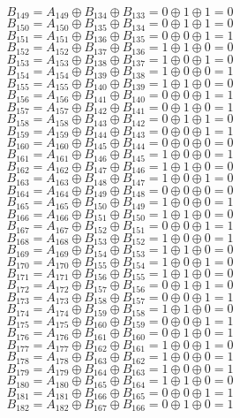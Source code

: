 \documentclass[12pt,onecolumn]{article}
\begin{document}
$$B_{149} = A_{149} \oplus B_{134} \oplus B_{133} = 0 \oplus 1 \oplus 1 = 0$$
$$B_{150} = A_{150} \oplus B_{135} \oplus B_{134} = 0 \oplus 1 \oplus 1 = 0$$
$$B_{151} = A_{151} \oplus B_{136} \oplus B_{135} = 0 \oplus 0 \oplus 1 = 1$$
$$B_{152} = A_{152} \oplus B_{137} \oplus B_{136} = 1 \oplus 1 \oplus 0 = 0$$
$$B_{153} = A_{153} \oplus B_{138} \oplus B_{137} = 1 \oplus 0 \oplus 1 = 0$$
$$B_{154} = A_{154} \oplus B_{139} \oplus B_{138} = 1 \oplus 0 \oplus 0 = 1$$
$$B_{155} = A_{155} \oplus B_{140} \oplus B_{139} = 1 \oplus 1 \oplus 0 = 0$$
$$B_{156} = A_{156} \oplus B_{141} \oplus B_{140} = 0 \oplus 0 \oplus 1 = 1$$
$$B_{157} = A_{157} \oplus B_{142} \oplus B_{141} = 0 \oplus 1 \oplus 0 = 1$$
$$B_{158} = A_{158} \oplus B_{143} \oplus B_{142} = 0 \oplus 1 \oplus 1 = 0$$
$$B_{159} = A_{159} \oplus B_{144} \oplus B_{143} = 0 \oplus 0 \oplus 1 = 1$$
$$B_{160} = A_{160} \oplus B_{145} \oplus B_{144} = 0 \oplus 0 \oplus 0 = 0$$
$$B_{161} = A_{161} \oplus B_{146} \oplus B_{145} = 1 \oplus 0 \oplus 0 = 1$$
$$B_{162} = A_{162} \oplus B_{147} \oplus B_{146} = 1 \oplus 1 \oplus 0 = 0$$
$$B_{163} = A_{163} \oplus B_{148} \oplus B_{147} = 1 \oplus 0 \oplus 1 = 0$$
$$B_{164} = A_{164} \oplus B_{149} \oplus B_{148} = 0 \oplus 0 \oplus 0 = 0$$
$$B_{165} = A_{165} \oplus B_{150} \oplus B_{149} = 1 \oplus 0 \oplus 0 = 1$$
$$B_{166} = A_{166} \oplus B_{151} \oplus B_{150} = 1 \oplus 1 \oplus 0 = 0$$
$$B_{167} = A_{167} \oplus B_{152} \oplus B_{151} = 0 \oplus 0 \oplus 1 = 1$$
$$B_{168} = A_{168} \oplus B_{153} \oplus B_{152} = 1 \oplus 0 \oplus 0 = 1$$
$$B_{169} = A_{169} \oplus B_{154} \oplus B_{153} = 1 \oplus 1 \oplus 0 = 0$$
$$B_{170} = A_{170} \oplus B_{155} \oplus B_{154} = 1 \oplus 0 \oplus 1 = 0$$
$$B_{171} = A_{171} \oplus B_{156} \oplus B_{155} = 1 \oplus 1 \oplus 0 = 0$$
$$B_{172} = A_{172} \oplus B_{157} \oplus B_{156} = 0 \oplus 1 \oplus 1 = 0$$
$$B_{173} = A_{173} \oplus B_{158} \oplus B_{157} = 0 \oplus 0 \oplus 1 = 1$$
$$B_{174} = A_{174} \oplus B_{159} \oplus B_{158} = 1 \oplus 1 \oplus 0 = 0$$
$$B_{175} = A_{175} \oplus B_{160} \oplus B_{159} = 0 \oplus 0 \oplus 1 = 1$$
$$B_{176} = A_{176} \oplus B_{161} \oplus B_{160} = 0 \oplus 1 \oplus 0 = 1$$
$$B_{177} = A_{177} \oplus B_{162} \oplus B_{161} = 1 \oplus 0 \oplus 1 = 0$$
$$B_{178} = A_{178} \oplus B_{163} \oplus B_{162} = 1 \oplus 0 \oplus 0 = 1$$
$$B_{179} = A_{179} \oplus B_{164} \oplus B_{163} = 1 \oplus 0 \oplus 0 = 1$$
$$B_{180} = A_{180} \oplus B_{165} \oplus B_{164} = 1 \oplus 1 \oplus 0 = 0$$
$$B_{181} = A_{181} \oplus B_{166} \oplus B_{165} = 0 \oplus 0 \oplus 1 = 1$$
$$B_{182} = A_{182} \oplus B_{167} \oplus B_{166} = 0 \oplus 1 \oplus 0 = 1$$
\end{document}

